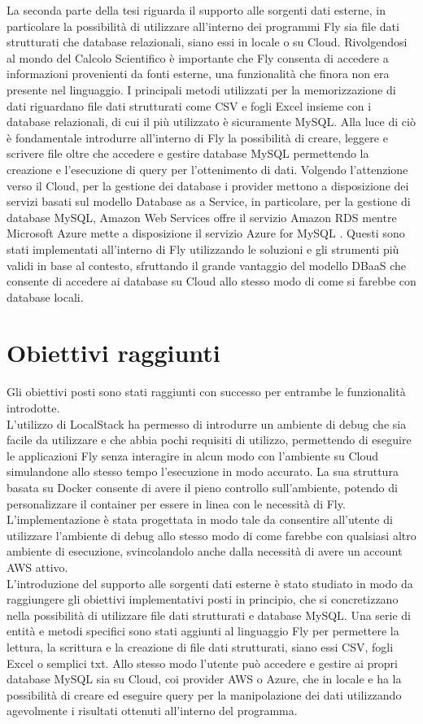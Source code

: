 La seconda parte della tesi riguarda il supporto alle sorgenti dati esterne, in particolare la possibilità di utilizzare all'interno dei programmi Fly sia file dati strutturati che database relazionali, siano essi in locale o su Cloud. Rivolgendosi al mondo del Calcolo Scientifico è importante che Fly consenta di accedere a informazioni provenienti da fonti esterne, una funzionalità che finora non era presente nel linguaggio. I principali metodi utilizzati per la memorizzazione di dati riguardano file dati strutturati come CSV e fogli Excel insieme con i database relazionali, di cui il più utilizzato è sicuramente MySQL. Alla luce di ciò è fondamentale introdurre all'interno di Fly la possibilità di creare, leggere e scrivere file oltre che accedere e gestire database MySQL permettendo la creazione e l'esecuzione di query per l'ottenimento di dati. Volgendo l'attenzione verso il Cloud, per la gestione dei database i provider mettono a disposizione dei servizi basati sul modello Database as a Service, in particolare, per la gestione di database MySQL, Amazon Web Services offre il servizio Amazon RDS \cite{RDS} mentre Microsoft Azure mette a disposizione il servizio Azure for MySQL \cite{AzureMySQL}. Questi sono stati implementati all'interno di Fly utilizzando le soluzioni e gli strumenti più validi in base al contesto, sfruttando il grande vantaggio del modello DBaaS che consente di accedere ai database su Cloud allo stesso modo di come si farebbe con database locali.

\section{Obiettivi raggiunti}
Gli obiettivi posti sono stati raggiunti con successo per entrambe le funzionalità introdotte. \\
L'utilizzo di LocalStack ha permesso di introdurre un ambiente di debug che sia facile da utilizzare e che abbia pochi requisiti di utilizzo, permettendo di eseguire le applicazioni Fly senza interagire in alcun modo con l'ambiente su Cloud simulandone allo stesso tempo l'esecuzione in modo accurato. La sua struttura basata su Docker consente di avere il pieno controllo sull'ambiente, potendo di personalizzare il container per essere in linea con le necessità di Fly. L'implementazione è stata progettata in modo tale da consentire all'utente di utilizzare l'ambiente di debug allo stesso modo di come farebbe con qualsiasi altro ambiente di esecuzione, svincolandolo anche dalla necessità di avere un account AWS attivo.\\
L'introduzione del supporto alle sorgenti dati esterne è stato studiato in modo da raggiungere gli obiettivi implementativi posti in principio, che si concretizzano nella possibilità di utilizzare file dati strutturati e database MySQL. Una serie di entità e metodi specifici sono stati aggiunti al linguaggio Fly per permettere la lettura, la scrittura e la creazione di file dati strutturati, siano essi CSV, fogli Excel o semplici txt. Allo stesso modo l'utente può accedere e gestire ai propri database MySQL sia su Cloud, coi provider AWS o Azure, che in locale e ha la possibilità di creare ed eseguire query per la manipolazione dei dati utilizzando agevolmente i risultati ottenuti all'interno del programma.

